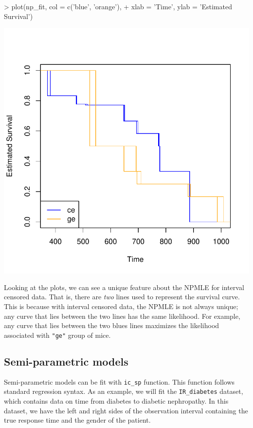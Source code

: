 \documentclass[a4paper]{article}
\begin{document}
\begin{Schunk}
\begin{Sinput}
> plot(np_fit, col = c('blue', 'orange'),
+      xlab = 'Time', ylab = 'Estimated Survival')
\end{Sinput}
\end{Schunk}
\includegraphics{icenReg-006}


Looking at the plots, we can see a unique feature about the NPMLE for interval censored data. That is, there are \emph{two} lines used to represent the survival curve. This is because with interval censored data, the NPMLE is not always unique; any curve that lies between the two lines has the same likelihood. For example, any curve that lies between the two blues lines maximizes the likelihood associated with \texttt{"ge"} group of mice. 


\subsection{Semi-parametric models}

Semi-parametric models can be fit with \texttt{ic\_sp} function. This function follows standard regression syntax. As an example, we will fit the \texttt{IR\_diabetes} dataset, which contains data on time from diabetes to diabetic nephropathy. In this dataset, we have the left and right sides of the observation interval containing the true response time and the gender of the patient. 
  
\end{document}
